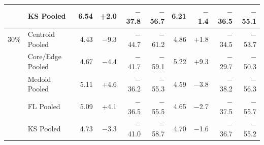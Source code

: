 \begin{table}[t]
\begin{tabular}{llrrrrrrrr}
 & KS Pooled & 6.54 & +2.0 & $-$37.8 & $-$56.7 & 6.21 & $-$1.4 & $-$36.5 & $-$55.1 \\
\midrule
30\% & Centroid Pooled & 4.43 & $-$9.3 & $-$44.7 & $-$61.2 & 4.86 & +1.8 & $-$34.5 & $-$53.7 \\
 & Core/Edge Pooled & 4.67 & $-$4.4 & $-$41.7 & $-$59.1 & 5.22 & +9.3 & $-$29.7 & $-$50.3 \\
 & Medoid Pooled & 5.11 & +4.6 & $-$36.2 & $-$55.3 & 4.59 & $-$3.8 & $-$38.2 & $-$56.3 \\
 & FL Pooled & 5.09 & +4.1 & $-$36.5 & $-$55.5 & 4.65 & $-$2.7 & $-$37.5 & $-$55.7 \\
 & KS Pooled & 4.73 & $-$3.3 & $-$41.0 & $-$58.7 & 4.70 & $-$1.6 & $-$36.7 & $-$55.2 \\
\bottomrule
\end{tabular}
\end{table}
